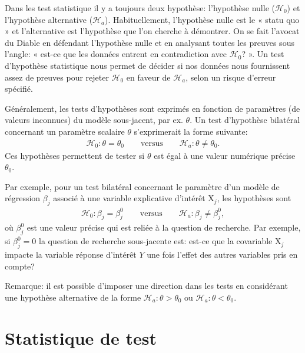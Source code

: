 \documentclass[
  11pt,
  letterpaper,
]{scrbook}
\theoremstyle{definition}
\theoremstyle{definition}
\theoremstyle{remark}
\begin{document}
Dans les test statistique il y a toujours deux hypothèse: l'hypothèse
nulle (\(\mathscr{H}_{0}\)) et l'hypothèse alternative
(\(\mathscr{H}_a\)). Habituellement, l'hypothèse nulle est le « statu
quo » et l'alternative est l'hypothèse que l'on cherche à démontrer. On
se fait l'avocat du Diable en défendant l'hypothèse nulle et en
analysant toutes les preuves sous l'angle: « est-ce que les données
entrent en contradiction avec \(\mathscr{H}_0\)? ». Un test d'hypothèse
statistique nous permet de décider si nos données nous fournissent assez
de preuves pour rejeter \(\mathscr{H}_0\) en faveur de
\(\mathscr{H}_a\), selon un risque d'erreur spécifié.

Généralement, les tests d'hypothèses sont exprimés en fonction de
paramètres (de valeurs inconnues) du modèle sous-jacent, par ex.
\(\theta\). Un test d'hypothèse bilatéral concernant un paramètre
scalaire \(\theta\) s'exprimerait la forme suivante: \begin{align*}
\mathscr{H}_0: \theta=\theta_0 \qquad \text{versus} \qquad \mathscr{H}_a:\theta \neq \theta_0.
\end{align*} Ces hypothèses permettent de tester si \(\theta\) est égal
à une valeur numérique précise \(\theta_0\).

Par exemple, pour un test bilatéral concernant le paramètre d'un modèle
de régression \(\beta_j\) associé à une variable explicative d'intérêt
\(\mathrm{X}_j\), les hypothèses sont \begin{align*}
\mathscr{H}_0: \beta_j=\beta_j^0 \qquad \text{versus} \qquad \mathscr{H}_a:\beta_j \neq \beta_j^0,
\end{align*} où \(\beta_j^0\) est une valeur précise qui est reliée à la
question de recherche. Par exemple, si \(\beta_j^0=0\) la question de
recherche sous-jacente est: est-ce que la covariable \(\mathrm{X}_j\)
impacte la variable réponse d'intérêt \(Y\) une fois l'effet des autres
variables pris en compte?

Remarque: il est possible d'imposer une direction dans les tests en
considérant une hypothèse alternative de la forme
\(\mathscr{H}_a: \theta > \theta_0\) ou
\(\mathscr{H}_a: \theta < \theta_0\).

\section{Statistique de test}\label{statistique-de-test}
\end{document}
